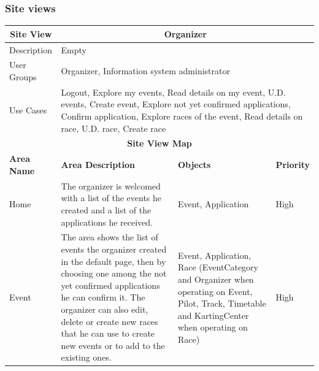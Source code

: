 \documentclass{beamer}
\begin{document}
\begin{frame}
    \frametitle{Site views}
    \begin{table}
        \centering
        \tiny
        \setlength{\tabcolsep}{1pt}
        \begin{tabular}{|m{2cm}|m{4cm}|m{3cm}|m{1cm}|}
        \hline
        \multicolumn{1}{|c|}{\textbf{Site View}} & \multicolumn{3}{c|}{\textbf{Organizer}} \\
        \hline
        Description & \multicolumn{3}{m{8cm}|}{Empty} \\
        \hline
        User Groups & \multicolumn{3}{m{8cm}|}{Organizer, Information system administrator} \\
        \hline
        Use Cases & \multicolumn{3}{m{8cm}|}{Logout, Explore my events, Read details on my event,
        U.D. events, Create event, Explore not yet confirmed applications, Confirm application, 
        Explore races of the event, Read details on race, U.D. race, Create race} \\
        \hline
        \multicolumn{4}{|c|}{\textbf{Site View Map}} \\
        \hline
        \textbf{Area Name} & \textbf{Area Description} & \textbf{Objects} & \textbf{Priority} \\
        \hline
        Home & The organizer is welcomed with a list of the events he created and a list
        of the applications he received.
         & Event, Application & High \\
        \hline
        Event & The area shows the list of events the organizer created in the default page,
        then by choosing one among the not yet confirmed applications he can confirm it.
        The organizer can also edit, delete or create new races that he can use to 
        create new events or to add to the existing ones.
         & Event, Application, Race (EventCategory and Organizer when operating on Event,
        Pilot, Track, Timetable and KartingCenter when operating on Race)
        & High \\
        \hline
        \end{tabular}
    \end{table}
\end{frame}
\end{document}
